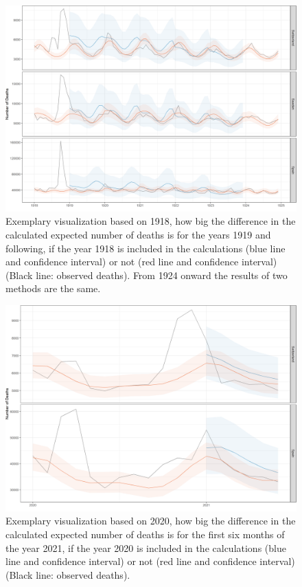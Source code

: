 \documentclass{article}
\begin{document}
	
	\begin{figure}[H]
		\centering	
		\includegraphics[width=\linewidth]{../Figure_S6a.png}
		\caption{Exemplary visualization based on 1918, how big the difference in the calculated expected number of deaths is for the years 1919 and following, if the year 1918 is included in the calculations (blue line and confidence interval) or not (red line and confidence interval) (Black line: observed deaths). From 1924 onward the results of two methods are the same. }
	\end{figure}
	
	\begin{figure}[H]
		\centering	
		\includegraphics[width=\linewidth]{../Figure_S6b.png}
		\caption{Exemplary visualization based on 2020, how big the difference in the calculated expected number of deaths is for the first six months of the year 2021, if the year 2020 is included in the calculations (blue line and confidence interval) or not (red line and confidence interval) (Black line: observed deaths). }
	\end{figure}




	
	\clearpage


	
	
		
	
\end{document}

